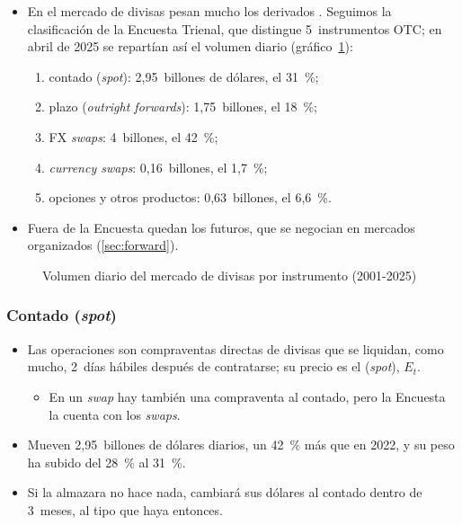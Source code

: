 \documentclass[11pt]{article}
\begin{document}
\begin{itemize}
\item En el mercado de divisas pesan mucho los derivados . Seguimos la clasificación de la Encuesta Trienal, que distingue 5~instrumentos OTC; en abril de 2025 se repartían así el volumen diario\nocite{BIS2026TrienalDatos,HuangKrohnSushko2025FX} (gráfico~\ref{fig:instrumentos-bis}):
  \begin{enumerate}
  \item contado (\emph{spot}): 2,95~billones de dólares, el 31~\%;
  \item plazo (\emph{outright forwards}): 1,75~billones, el 18~\%;
  \item FX \emph{swaps}: 4~billones, el 42~\%;
  \item \emph{currency swaps}: 0,16~billones, el 1,7~\%;
  \item opciones y otros productos: 0,63~billones, el 6,6~\%.
  \end{enumerate}
\item Fuera de la Encuesta quedan los futuros, que se negocian en mercados organizados (\ref{sec:forward}).
\end{itemize}

\begin{figure}[H]
\centering
\caption{Volumen diario del mercado de divisas por instrumento (2001-2025)}\label{fig:instrumentos-bis}
\end{figure}

\subsubsection{Contado (\emph{spot})}\label{sec:spot}

\begin{itemize}
\item Las operaciones  son compraventas directas de divisas que se liquidan, como mucho, 2~días hábiles después de contratarse; su precio es el  (\emph{spot}), $E_t$.
  \begin{itemize}
  \item En un \emph{swap} hay también una compraventa al contado, pero la Encuesta la cuenta con los \emph{swaps}.
  \end{itemize}
\item Mueven 2,95~billones de dólares diarios, un 42~\% más que en 2022, y su peso ha subido del 28~\% al 31~\%\nocite{BIS2026TrienalDatos,HuangKrohnSushko2025FX}.
\item Si la almazara no hace nada, cambiará sus dólares al contado dentro de 3~meses, al tipo que haya entonces.
\end{itemize}
\end{document}
